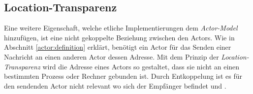 \subsection{Location-Transparenz}\label{actor:locationTransparency}
Eine weitere Eigenschaft, welche etliche Implementierungen dem \textit{Actor-Model} hinzufügen, ist eine nicht gekoppelte Beziehung zwischen den Actors. Wie in Abschnitt \ref{actor:definition} erklärt, benötigt ein Actor für das Senden einer Nachricht an einen anderen Actor dessen Adresse. Mit dem Prinzip der \textit{Location-Transparenz} wird die Adresse eines Actors so gestaltet, dass sie nicht an einen bestimmten Prozess oder Rechner gebunden ist. Durch Entkoppelung ist es für den sendenden Actor nicht relevant wo sich der Empfänger befindet \citep{Vernon2015ReactiveAkka} und \citep{sargent2016play}.

